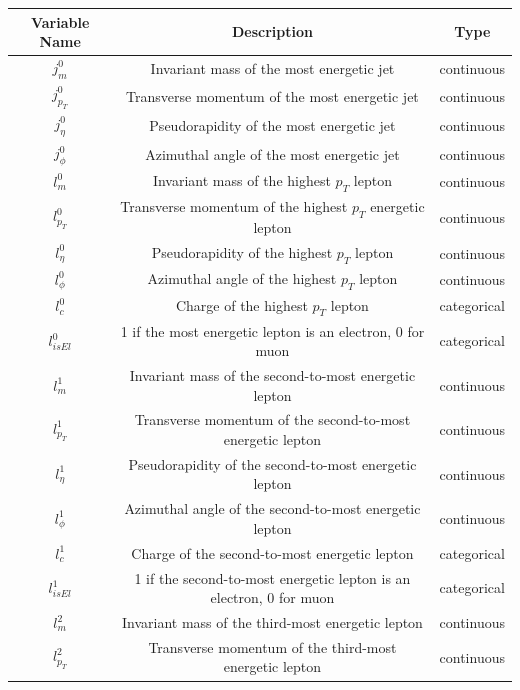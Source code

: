 \documentclass[11pt]{article}
\begin{document}
\begin{table}[!htbp]
\begin{center}
\begin{tabular}{|c|c|c|}

  \hline
  Variable Name & Description & Type \\
 \hline
 \hline
$ j^0_m $ & Invariant mass of the most energetic jet & continuous\\
\hline
$ j^0_{p_T} $ & Transverse momentum of the most energetic jet & continuous\\
\hline
$ j^0_{\eta} $ & Pseudorapidity of the most energetic jet & continuous\\
\hline
$ j^0_{\phi} $ & Azimuthal angle of the most energetic jet & continuous\\
\hline
$ l^0_m $ & Invariant mass of the highest $p_T$ lepton & continuous\\
\hline
$ l^0_{p_T} $ & Transverse momentum of the highest $p_T$ energetic lepton & continuous\\
\hline
$ l^0_{\eta} $ & Pseudorapidity of the  highest $p_T$ lepton & continuous\\
\hline
$ l^0_{\phi} $ & Azimuthal angle of the highest $p_T$ lepton & continuous\\
\hline
$ l^0_c $ & Charge of the  highest $p_T$ lepton & categorical\\
\hline
$ l^0_{isEl} $ & 1 if the most energetic lepton is an electron, 0 for muon & categorical\\
\hline
$ l^1_m $ & Invariant mass of the second-to-most energetic lepton & continuous\\
\hline
$ l^1_{p_T} $ & Transverse momentum of the second-to-most energetic lepton & continuous\\
\hline
$ l^1_{\eta} $ & Pseudorapidity of the second-to-most energetic lepton & continuous\\
\hline
$ l^1_{\phi} $ & Azimuthal angle of the second-to-most energetic lepton & continuous\\
\hline
$ l^1_c $ & Charge of the second-to-most energetic lepton & categorical\\
\hline
$ l^1_{isEl} $ & 1 if the second-to-most energetic lepton is an electron, 0 for muon & categorical\\
\hline
$ l^2_m $ & Invariant mass of the third-most energetic lepton & continuous\\
\hline
$ l^2_{p_T} $ & Transverse momentum of the third-most energetic lepton & continuous\\

\end{tabular}
\end{center}
\end{table}
\end{document}
